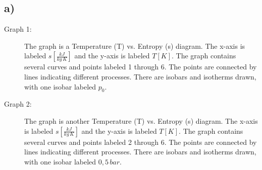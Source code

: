 

\subsection*{a)}

\begin{description}
    \item[Graph 1:] 
    The graph is a Temperature (T) vs. Entropy (s) diagram. The x-axis is labeled $s \left[\frac{kJ}{kg\,K}\right]$ and the y-axis is labeled $T \left[K\right]$. The graph contains several curves and points labeled 1 through 6. The points are connected by lines indicating different processes. There are isobars and isotherms drawn, with one isobar labeled $p_0$.
    
    \item[Graph 2:] 
    The graph is another Temperature (T) vs. Entropy (s) diagram. The x-axis is labeled $s \left[\frac{kJ}{kg\,K}\right]$ and the y-axis is labeled $T \left[K\right]$. The graph contains several curves and points labeled 2 through 6. The points are connected by lines indicating different processes. There are isobars and isotherms drawn, with one isobar labeled $0{,}5\,bar$.
\end{description}
